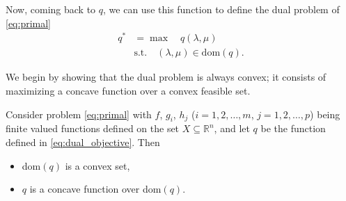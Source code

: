 \documentclass[10pt,a4paper]{article}
\begin{document}
\noindent Now, coming back to $q$, we can use this function to define the dual problem of \eqref{eq:primal}
\begin{equation}\label{eq:dual}
	\begin{aligned}
		q^* &= \max \quad q(\lambda, \mu) \\
		&\text{s.t.} \quad (\lambda, \mu) \in \text{dom}(q).
	\end{aligned}
\end{equation}

\noindent We begin by showing that the dual problem is always convex; it consists of maximizing a
concave function over a convex feasible set.

\begin{theorem}
	Consider problem \eqref{eq:primal} with $f$, $g_i$, $h_j$
	($i = 1, 2, \ldots, m$, $j = 1, 2, \ldots, p$) being finite valued functions defined on the set $X \subseteq \mathbb{R}^n$, and
	let $q$ be the function defined in \eqref{eq:dual_objective}. Then
	\begin{itemize}
		\item[(a)] dom$(q)$ is a convex set,
		\item[(b)] $q$ is a concave function over dom$(q)$.
	\end{itemize}
\end{theorem}
\end{document}
